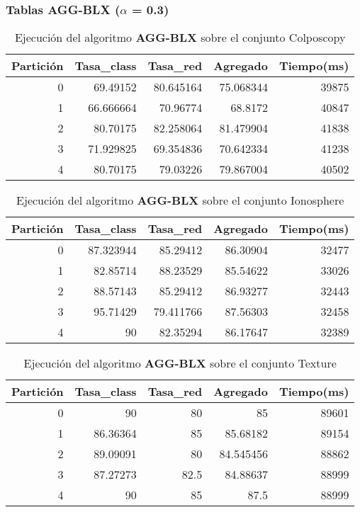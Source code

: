 \documentclass[size=a4, parskip=half, titlepage=false, toc=flat, toc=bib, 12pt]{scrartcl}
\begin{document}
\newpage

\subsubsection{Tablas AGG-BLX ($\alpha$ = 0.3)}

 \begin{table}[ht]
  \centering
  \begin{tabular}[t]{rrrrr}
  \toprule
  Partición &Tasa\_class &Tasa\_red & Agregado & Tiempo(ms)\\
  \midrule
0         & 69.49152  & 80.645164 & 75.068344 & 39875  \\
1         & 66.666664 & 70.96774  & 68.8172   & 40847  \\
2         & 80.70175  & 82.258064 & 81.479904 & 41838  \\
3         & 71.929825 & 69.354836 & 70.642334 & 41238  \\
4         & 80.70175  & 79.03226  & 79.867004 & 40502  \\
  \bottomrule
  \end{tabular}
  \caption{Ejecución del algoritmo \textbf{AGG-BLX} sobre el conjunto Colposcopy }
  \end{table}%

 \begin{table}[ht]
  \centering
  \begin{tabular}[t]{rrrrr}
  \toprule
  Partición &Tasa\_class &Tasa\_red & Agregado & Tiempo(ms)\\
  \midrule
0         & 87.323944 & 85.29412  & 86.30904 & 32477  \\
1         & 82.85714  & 88.23529  & 85.54622 & 33026  \\
2         & 88.57143  & 85.29412  & 86.93277 & 32443  \\
3         & 95.71429  & 79.411766 & 87.56303 & 32458  \\
4         & 90        & 82.35294  & 86.17647 & 32389  \\
  \bottomrule
  \end{tabular}
  \caption{Ejecución del algoritmo \textbf{AGG-BLX} sobre el conjunto Ionosphere}
  \end{table}%

 \begin{table}[ht]
  \centering
  \begin{tabular}[t]{rrrrr}
  \toprule
  Partición &Tasa\_class &Tasa\_red & Agregado & Tiempo(ms)\\
  \midrule
0         & 90        & 80       & 85        & 89601  \\
1         & 86.36364  & 85       & 85.68182  & 89154  \\
2         & 89.09091  & 80       & 84.545456 & 88862  \\
3         & 87.27273  & 82.5     & 84.88637  & 88999  \\
4         & 90        & 85       & 87.5      & 88999  \\
\bottomrule
  \end{tabular}
  \caption{Ejecución del algoritmo \textbf{AGG-BLX} sobre el conjunto Texture}
  \end{table}%
\end{document}
